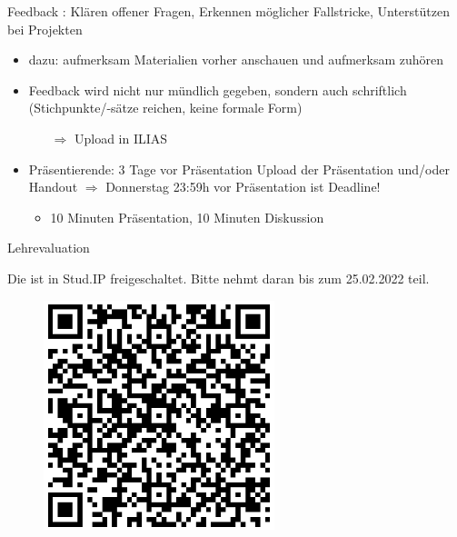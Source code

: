 \documentclass[11pt]{beamer}
\begin{document}
\begin{frame}{Feedback}
	: Klären offener Fragen, Erkennen möglicher Fallstricke, Unterstützen bei Projekten

	\begin{itemize}
		\item dazu: aufmerksam Materialien vorher anschauen und aufmerksam zuhören
		\item Feedback wird nicht nur mündlich gegeben, sondern auch schriftlich (Stichpunkte/-sätze reichen, keine formale Form)
			\begin{itemize}
				\item[$\Rightarrow$] Upload in ILIAS
			\end{itemize}
		\item Präsentierende: 3 Tage vor Präsentation Upload der Präsentation und/oder Handout $\Rightarrow$ Donnerstag 23:59h vor Präsentation ist Deadline!
			\begin{itemize}
				\item 10 Minuten Präsentation, 10 Minuten Diskussion	
			\end{itemize}
	\end{itemize}
\end{frame}

\begin{frame}{Lehrevaluation}

Die  ist in Stud.IP freigeschaltet. Bitte nehmt daran bis zum 25.02.2022 teil. 
\begin{center}

\begin{figure}[ht]
	\includegraphics[width=0.6\textwidth]{./pics/evaluation.png}
	\label{Fig:XXX}
\end{figure}

\end{center}	
\end{frame}
\end{document}
